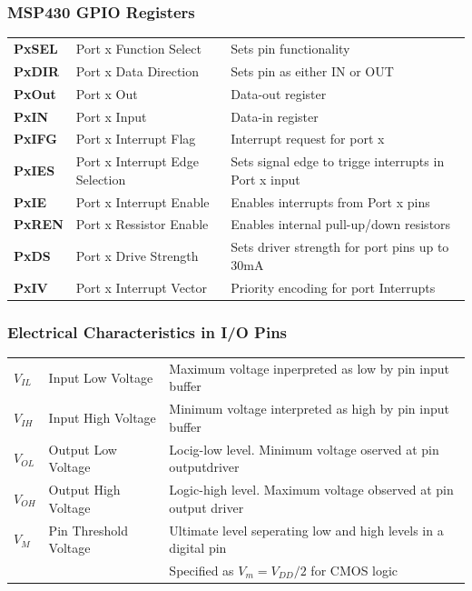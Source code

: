 \subsubsection{MSP430 GPIO Registers}
\begin{tabular}{>{\bfseries}lll}
	PxSEL   &Port x Function Select             & Sets pin functionality  \\ 
	PxDIR   &Port x Data Direction              & Sets pin as either IN or OUT \\ 
	PxOut   &Port x Out                         & Data-out register \\ 
	PxIN    &Port x Input                       & Data-in register  \\ 
	PxIFG   &Port x Interrupt Flag              & Interrupt request for port x \\ 
	PxIES   &Port x Interrupt Edge Selection    & Sets signal edge to trigge interrupts in Port x input  \\ 
	PxIE    &Port x Interrupt Enable            & Enables interrupts from Port x pins \\ 
	PxREN   &Port x Ressistor Enable            & Enables internal pull-up/down resistors \\ 
	PxDS    &Port x Drive Strength              & Sets driver strength for port pins up to 30mA  \\ 
	PxIV    &Port x Interrupt Vector            & Priority encoding for port Interrupts \\ 
\end{tabular} 

\subsubsection{Electrical Characteristics in I/O Pins}
\begin{tabular}{lll}
	$ V_{IL} $& Input Low Voltage&Maximum voltage inperpreted as low by pin input buffer\\
	$ V_{IH} $& Input High Voltage& Minimum voltage interpreted as high by pin input buffer\\
	$ V_{OL} $& Output Low Voltage& Locig-low level. Minimum voltage oserved at pin outputdriver\\
	$ V_{OH} $& Output High Voltage& Logic-high level. Maximum voltage observed at pin output driver\\
	$ V_M $   & Pin Threshold Voltage& Ultimate level seperating low and high levels in a digital pin\\
	&                      & Specified as $ V_m=V_{DD}/2 $ for CMOS logic\\
\end{tabular} 
\clearpage

